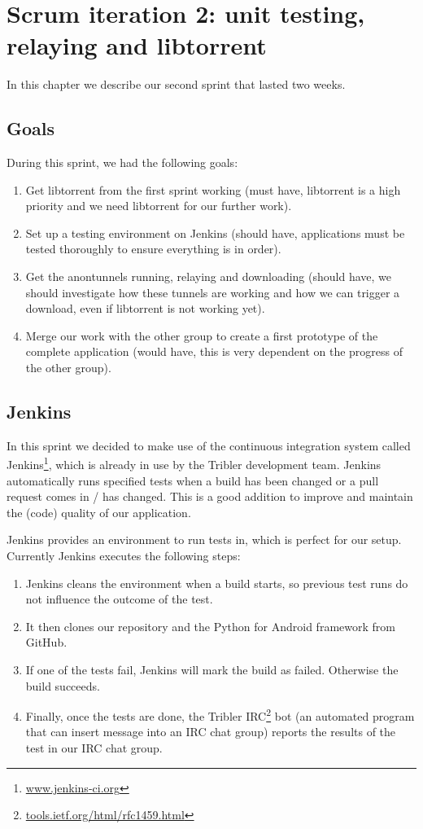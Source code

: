 \chapter{Scrum iteration 2: unit testing, relaying and libtorrent}
\label{cpt:iteration2}
	In this chapter we describe our second sprint that lasted two weeks.

	\section{Goals}
		During this sprint, we had the following goals:
	
		\begin{enumerate}
			\item Get libtorrent from the first sprint working (must have, libtorrent is a high priority and we need libtorrent for our further work).
			\item Set up a testing environment on Jenkins (should have, applications must be tested thoroughly to ensure everything is in order).
			\item Get the anontunnels running, relaying and downloading (should have, we should investigate how these tunnels are working and how we can trigger a download, even if libtorrent is not working yet).
			\item Merge our work with the other group to create a first prototype of the complete application (would have, this is very dependent on the progress of the other group).
		\end{enumerate}
	
	\section{Jenkins}
		\label{sec:jenkins}
		In this sprint we decided to make use of the continuous integration system called Jenkins\footnote{\href{http://jenkins-ci.org}{www.jenkins-ci.org}}, which is already in use by the Tribler development team. Jenkins automatically runs specified tests when a build has been changed or a pull request comes in / has changed. This is a good addition to improve and maintain the (code) quality of our application.
		
		Jenkins provides an environment to run tests in, which is perfect for our setup. Currently Jenkins executes the following steps:
		
		\begin{enumerate}
			\item Jenkins cleans the environment when a build starts, so previous test runs do not influence the outcome of the test.
			\item It then clones our repository and the Python for Android framework from GitHub.
			\item If one of the tests fail, Jenkins will mark the build as failed. Otherwise the build succeeds.
			\item Finally, once the tests are done, the Tribler IRC\footnote{\href{http://tools.ietf.org/html/rfc1459.html}{tools.ietf.org/html/rfc1459.html}} bot (an automated program that can insert message into an IRC chat group) reports the results of the test in our IRC chat group.
		\end{enumerate} 
		
